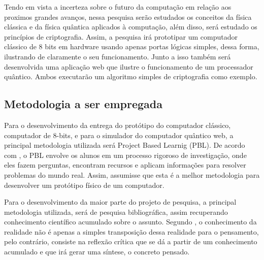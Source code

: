Tendo em vista a incerteza sobre o futuro da computação em relação aos proximos grandes avanços, nessa pesquisa serão estudados os conceitos da física clássica e da física quântica aplicados à computação, além disso, será estudado os princípios de criptografia. Assim, a pesquisa irá prototipar um computador clássico de 8 bits em hardware usando apenas portas lógicas simples, dessa forma, ilustrando de claramente o seu funcionamento. Junto a isso também será desenvolvida uma aplicação web que ilustre o funcionamento de um processador quântico. Ambos executarão um algoritmo simples de criptografia como exemplo.

\subsection{Metodologia a ser empregada}
Para o desenvolvimento da entrega do protótipo do computador clássico, computador de 8-bits, e para o simulador do computador quântico web, a principal metodologia utilizada será Project Based Learnig (PBL). De acordo com \cite{GrandRapidsBusinessJournalPBL}, o PBL envolve os alunos em um processo rigoroso de investigação, onde eles fazem perguntas, encontram recursos e aplicam informações para resolver problemas do mundo real. Assim, assumisse que esta é a melhor metodologia para desenvolver um protótipo físico de um computador.

Para o desenvolvimento da maior parte do projeto de pesquisa, a principal metodologia utilizada, será de pesquisa bibliográfica, assim recuperando conhecimento científico acumulado sobre o assunto. Segundo \cite{APesquisaBibliografica}, o conhecimento da realidade não é apenas a simples transposição dessa realidade para o pensamento, pelo contrário, consiste na reflexão crítica que se dá a partir de um conhecimento acumulado e que irá gerar uma síntese, o concreto pensado.
\newpage